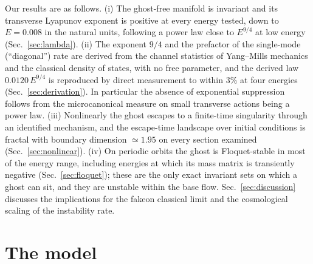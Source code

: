 \documentclass[11pt,a4paper]{article}
\begin{document}
Our results are as follows. (i) The ghost-free manifold is invariant and its transverse
Lyapunov exponent is positive at every energy tested, down to $E=0.008$ in the natural units,
following a power law close to $E^{9/4}$ at low energy
(Sec.~\ref{sec:lambda}). (ii) The exponent $9/4$ and the prefactor of the single-mode
(``diagonal'') rate are derived from the channel statistics of Yang--Mills mechanics and the
classical density of states, with no free parameter, and the derived law
$0.0120\,E^{9/4}$ is reproduced by direct measurement to within $3\%$ at four energies
(Sec.~\ref{sec:derivation}). In particular the absence of exponential suppression follows from the
microcanonical measure on small transverse actions being a power law. (iii) Nonlinearly the ghost
escapes to a finite-time singularity through an identified mechanism, and the escape-time
landscape over initial conditions is fractal with boundary dimension $\simeq1.95$ on every
section examined (Sec.~\ref{sec:nonlinear}). (iv) On periodic orbits the ghost is Floquet-stable
in most of the energy range, including energies at which its mass matrix is transiently negative
(Sec.~\ref{sec:floquet}); these are the only exact invariant sets on which a ghost can sit, and
they are unstable within the base flow. Sec.~\ref{sec:discussion} discusses the implications for
the fakeon classical limit and the cosmological scaling of the instability rate.

\section{The model}
\label{sec:model}
\end{document}
